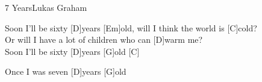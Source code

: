 \begin{song}{7 Years}{Lukas Graham}
    \begin{chorus}
        [C]Soon I'll be sixty [D]years [Em]old, will I think the world is [C]cold?\\
        Or will I have a lot of children who can [D]warm me?\\
        [Em]Soon I'll be sixty [D]years [G]old [C]
    \end{chorus}
    
    
    \begin{outro}
        [Em]Once I was seven [D]years [G]old
    \end{outro}

\end{song}
